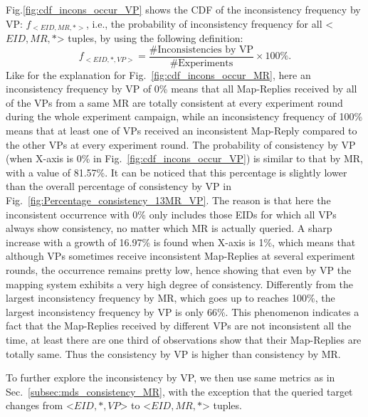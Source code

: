Fig.\ref{fig:cdf_incons_occur_VP} shows the CDF of the inconsistency frequency by VP: $f_{<EID, MR, *>}$, i.e., the probability of inconsistency frequency for all <$EID,MR,*$> tuples, by using the following definition: 
\begin{equation}
f_{<EID, *, VP>} = \frac{\text{\# Inconsistencies by VP}}{\text{\# Experiments}}\times100\%.
\end{equation}
Like for the explanation for Fig.~\ref{fig:cdf_incons_occur_MR}, here an inconsistency frequency by VP of 0\% means that all Map-Replies received by all of the VPs from a same MR are totally consistent at every experiment round during the whole experiment campaign, while an inconsistency frequency of 100\% means that at least one of VPs received an inconsistent Map-Reply compared to the other VPs at every experiment round. The probability of consistency by VP (when X-axis is 0\% in Fig.~\ref{fig:cdf_incons_occur_VP}) is similar to that by MR, with a value of 81.57\%. It can be noticed that this percentage is slightly lower than the overall percentage of consistency by VP in Fig.~\ref{fig:Percentage_consistency_13MR_VP}. The reason is that here the inconsistent occurrence with 0\% only includes those EIDs for which all VPs always show consistency, no matter which MR is actually queried. A sharp increase with a growth of 16.97\% %
is found when X-axis is 1\%, which means that although VPs sometimes receive inconsistent Map-Replies at several experiment rounds, the occurrence remains pretty low, hence showing that even by VP  the mapping system exhibits a very high degree of consistency. Differently from the largest inconsistency frequency by MR, which goes up to reaches 100\%, the largest inconsistency frequency by VP is only 66\%. This phenomenon indicates a fact that the Map-Replies received by different VPs are not inconsistent all the time, at least there are one third of observations show that their Map-Replies are totally same. Thus the consistency by VP is higher than consistency by MR.

To further explore the inconsistency by VP, we then use same metrics as in Sec.~\ref{subsec:mds_consistency_MR}, with the exception that the queried target changes from <$EID, *, VP$> to <$EID, MR, *$> tuples.

